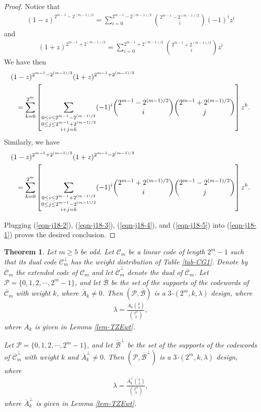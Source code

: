 \documentclass[1p,final]{elsarticle}
\newtheorem{theorem}{Theorem}
\newcommand{\cP}{{\mathcal{P}}}
\newcommand{\cB}{{\mathcal{B}}}
\newcommand{\C}{{\mathcal{C}}}
\begin{document}
\begin{proof}
Notice that 
\begin{eqnarray*}
(1-z)^{2^{m-1}-2^{(m-1)/2}}=\sum_{i=0}^{2^{m-1}-2^{(m-1)/2}} \binom{2^{m-1}-2^{(m-1)/2}}{i} (-1)^i z^i   
\end{eqnarray*} 
and 
\begin{eqnarray*}
(1+z)^{2^{m-1}+2^{(m-1)/2}}=\sum_{i=0}^{2^{m-1}+2^{(m-1)/2}} \binom{2^{m-1}+2^{(m-1)/2}}{i} z^i   
\end{eqnarray*} 
We have then 
\begin{eqnarray}\label{eqn-j18-4}
\lefteqn{(1-z)^{2^{m-1}-2^{(m-1)/2}} (1+z)^{2^{m-1}+2^{(m-1)/2}} } \nonumber \\
& & = \sum_{k=0}^{2^m} 
\left[ \sum_{\substack{0 \le i \le 2^{m-1}-2^{(m-1)/2} \\
0\le j \le 2^{m-1}+2^{(m-1)/2} \\i+j=k}}(-1)^i \binom{2^{m-1}-2^{(m-1)/2}} {i} \binom{2^{m-1}+2^{(m-1)/2}}{j}     \right] z^k.  
\end{eqnarray}
Similarly, we have 
\begin{eqnarray}\label{eqn-j18-5}
\lefteqn{(1-z)^{2^{m-1}+2^{(m-1)/2}} (1+z)^{2^{m-1}-2^{(m-1)/2}} } \nonumber \\
& & = \sum_{k=0}^{2^m} 
\left[ \sum_{\substack{0 \le i \le 2^{m-1}+2^{(m-1)/2} \\
0\le j \le 2^{m-1}-2^{(m-1)/2} \\i+j=k}}(-1)^i \binom{2^{m-1}+2^{(m-1)/2}} {i} \binom{2^{m-1}-2^{(m-1)/2}}{j}     \right] z^k.  
\end{eqnarray}

Plugging (\ref{eqn-j18-2}), (\ref{eqn-j18-3}), (\ref{eqn-j18-4}), and (\ref{eqn-j18-5}) into 
(\ref{eqn-j18-1}) proves the desired conclusion.  
\end{proof}

\begin{theorem}\label{thm-newdesigns2}
Let $m \geq 5$ be odd. 
Let $\C_m$ be a linear code of length $2^m-1$ such that its dual code
$\C_m^\perp$ has the weight distribution of Table \ref{tab-CG1}. Denote by $\overline{\C}_m$ 
the extended code of $\C_m$ and let $\overline{\C}_m^\perp$ denote the dual of $\overline{\C}_m$.
Let $\cP=\{0,1,2, \cdots, 2^m-1\}$, and let $\overline{\cB}$ be  the set of  the supports of the codewords of $\overline{\C}_m$
with weight $k$, where $\overline{A}_k \neq 0$. Then $(\cP, \overline{\cB})$
is a $3$-$(2^m, k, \lambda)$ design, where
\begin{eqnarray*}
\lambda=\frac{\overline{A}_k\binom{k}{3}}{\binom{2^m}{3}}, 
\end{eqnarray*}
where $\overline{A}_k$ is given in Lemma \ref{lem-TZEwt}. 

Let $\cP=\{0,1,2, \cdots, 2^m-1\}$, and let $\overline{\cB}^\perp$ be  the set of  the supports of the codewords of
$\overline{\C}_m^\perp$
with weight $k$ and $\overline{A}_k^\perp \neq 0$. Then $(\cP, \overline{\cB}^\perp)$
is a $3$-$(2^m, k, \lambda)$ design, where
\begin{eqnarray*}
\lambda=\frac{\overline{A}_k^\perp\binom{k}{3}}{\binom{2^m}{3}}, 
\end{eqnarray*}
where $\overline{A}_k^\perp$ is given in Lemma \ref{lem-TZEwt}. 
\end{theorem}
\end{document}
